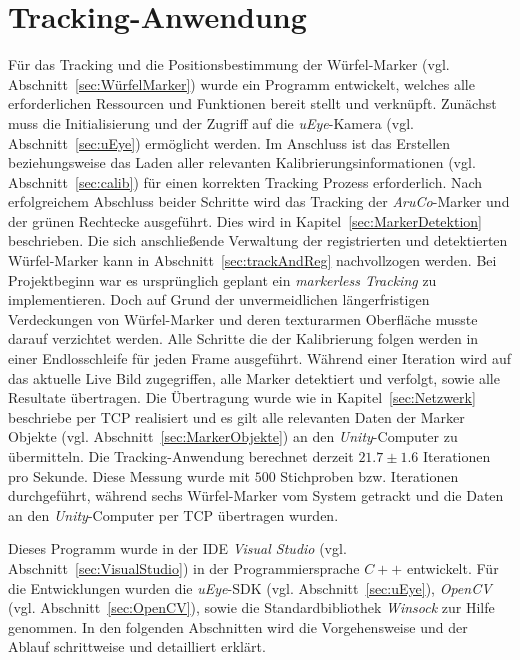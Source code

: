 \section{Tracking-Anwendung} \label{sec:Tracking}
Für das Tracking und die Positionsbestimmung der Würfel-Marker (vgl. Abschnitt~\ref{sec:WürfelMarker}) wurde ein Programm entwickelt, welches alle erforderlichen Ressourcen und Funktionen bereit stellt und verknüpft. Zunächst muss die Initialisierung und der Zugriff auf die \textit{uEye}-Kamera (vgl. Abschnitt~\ref{sec:uEye}) ermöglicht werden. Im Anschluss ist das Erstellen beziehungsweise das Laden aller relevanten Kalibrierungsinformationen (vgl. Abschnitt~\ref{sec:calib}) für einen korrekten Tracking Prozess erforderlich. Nach erfolgreichem Abschluss beider Schritte wird das Tracking der \textit{AruCo}-Marker und der grünen Rechtecke ausgeführt. Dies wird in Kapitel~\ref{sec:MarkerDetektion} beschrieben. Die sich anschließende Verwaltung der registrierten und detektierten Würfel-Marker kann in Abschnitt~\ref{sec:trackAndReg} nachvollzogen werden. Bei Projektbeginn war es ursprünglich geplant ein \textit{markerless Tracking} zu implementieren. Doch auf Grund der unvermeidlichen längerfristigen Verdeckungen von Würfel-Marker und deren texturarmen Oberfläche musste darauf verzichtet werden.
Alle Schritte die der Kalibrierung folgen werden in einer Endlosschleife für jeden Frame ausgeführt. Während einer Iteration wird auf das aktuelle Live Bild zugegriffen, alle Marker detektiert und verfolgt, sowie alle Resultate übertragen. Die Übertragung wurde wie in Kapitel~\ref{sec:Netzwerk} beschriebe per TCP realisiert und es gilt alle relevanten Daten der Marker Objekte (vgl. Abschnitt~\ref{sec:MarkerObjekte}) an den \textit{Unity}-Computer zu übermitteln. Die  Tracking-Anwendung berechnet derzeit $21.7 \pm 1.6$ Iterationen pro Sekunde. Diese Messung wurde mit $500$ Stichproben bzw. Iterationen durchgeführt, während sechs Würfel-Marker vom System getrackt und die Daten an den \textit{Unity}-Computer per TCP übertragen wurden.

Dieses Programm wurde in der IDE \textit{Visual Studio} (vgl. Abschnitt~\ref{sec:VisualStudio}) in der Programmiersprache $C++$ entwickelt. Für die Entwicklungen wurden die \textit{uEye}-SDK (vgl. Abschnitt~\ref{sec:uEye}), \textit{OpenCV} (vgl. Abschnitt~\ref{sec:OpenCV}), sowie die Standardbibliothek \textit{Winsock} zur Hilfe genommen. In den folgenden Abschnitten wird die Vorgehensweise und der Ablauf schrittweise und detailliert erklärt.

